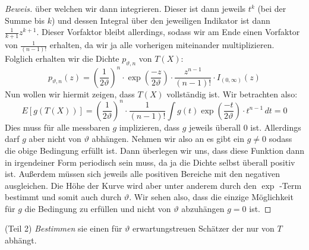 \documentclass[a4paper]{article}
\begin{document}
\begin{theorem}
\begin{proof}[Beweis]
	über welchen wir dann integrieren. Dieser ist dann jeweils $t ^{k}$ (bei der Summe bis $k$)
	und dessen Integral über den jeweiligen Indikator ist dann $\frac{ 1 }{ k+1 } z ^{k + 1}$.
	Dieser Vorfaktor bleibt allerdings, sodass wir am Ende einen Vorfaktor von $\frac{ 1 }{ (n-1)! }$
	erhalten, da wir ja alle vorherigen miteinander multiplizieren.
	Folglich erhalten wir die Dichte $p_{\vartheta, n}$ von $T(X)$:
	\[
		p_{\vartheta, n} (z) = \left(
			\frac{ 1 }{ 2 \vartheta }
		\right) ^{n} \cdot \exp \left(
			\frac{ -z }{ 2 \vartheta }
		\right) \cdot \frac{ z ^{ n - 1 } }{ (n-1) ! } \cdot I_{ ( 0, \infty ) } (z) 
	\] 
	Nun wollen wir hiermit zeigen, dass $T(X)$ vollständig ist. Wir betrachten also:
	\[
	E \left[
		g(T(X))
	\right] = \left(
		\frac{ 1 }{ 2 \vartheta }
	\right) ^{n} \cdot \frac{ 1 }{ (n-1)! }
	\int g(t) \exp \left(
		\frac{ -t }{ 2 \vartheta }
	\right) \cdot t ^{n-1} \, dt = 0
	\] 
	Dies muss für alle messbaren $g$ implizieren, dass $g$ jeweils überall $0$ ist.
	Allerdings darf $g$ aber nicht von $\vartheta$ abhängen. Nehmen wir also an es gibt
	ein $g \neq 0$ sodass die obige Bedingung erfüllt ist. Dann überlegen wir uns, dass
	diese Funktion dann in irgendeiner Form periodisch sein muss, da ja die Dichte selbst
	überall positiv ist. Außerdem müssen sich jeweils alle positiven Bereiche mit den
	negativen ausgleichen. Die Höhe der Kurve wird aber unter anderem durch den
	$\exp$ -Term bestimmt und somit auch durch $\vartheta$. Wir sehen also, dass die einzige
	Möglichkeit für $g$ die Bedingung zu erfüllen und nicht von $\vartheta$ abzuhängen $g=0$ ist.
\end{proof}

(Teil 2) \textit{Bestimmen} sie einen für $\vartheta$ erwartungstreuen Schätzer der nur von
$T$ abhängt.


\end{theorem}
\end{document}
